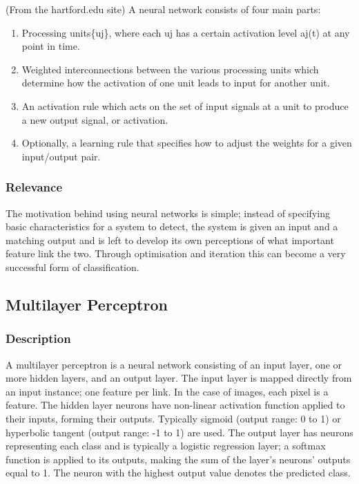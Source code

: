 (From the hartford.edu site)
A neural network consists of four main parts\cite{neural_def_russel}:
\begin{enumerate}
	\item Processing units\{uj\}, where each uj has a certain activation level aj(t) at any point in time.
	\item Weighted interconnections between the various processing units which determine how the activation of one unit leads to input for another unit.
	\item An activation rule which acts on the set of input signals at a unit to produce a new output signal, or activation.
	\item Optionally, a learning rule that specifies how to adjust the weights for a given input/output pair.
\end{enumerate}


\subsubsection{Relevance}
The motivation behind using neural networks is simple; instead of specifying basic characteristics for a system to detect, the system is given an input and a matching output and is left to develop its own perceptions of what important feature link the two. Through optimisation and iteration this can become a very successful form of classification.

\subsection{Multilayer Perceptron}
\subsubsection{Description}
A multilayer perceptron is a neural network consisting of an input layer, one or more hidden layers, and an output layer. The input layer is mapped directly from an input instance; one feature per link. In the case of images, each pixel is a feature. The hidden layer neurons have non-linear activation function applied to their inputs, forming their outputs. Typically sigmoid (output range: 0 to 1) or hyperbolic tangent (output range: -1 to 1) are used. The output layer has neurons representing each class and is typically a logistic regression layer; a softmax function is applied to its outputs, making the sum of the layer's neurons' outputs equal to 1. The neuron with the highest output value denotes the predicted class.

